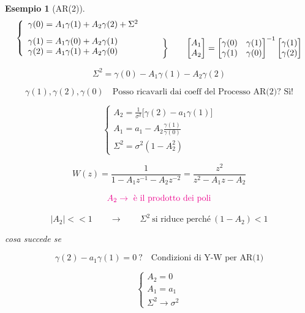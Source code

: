 \documentclass[11pt,a4paper]{article}
\newtheorem{example}{Esempio}
\begin{document}
\begin{example}[AR(2)]
\[
\left\{
\begin{array}{l}
\gamma(0)=A_1\gamma(1)+A_2\gamma(2)+\Sigma^2\\[0.8em]
\gamma(1)=A_1\gamma(0)+A_2\gamma(1)\\
\gamma(2)=A_1\gamma(1)+A_2\gamma(0)
\end{array}
\right.
\qquad
\raisebox{-1.2em}{$\left\}\vphantom{\begin{array}{l}
\gamma(1)=A_1\gamma(0)+A_2\gamma(1)\\
\gamma(2)=A_1\gamma(1)+A_2\gamma(0)
\end{array}}\right.$}
\qquad
\raisebox{-1.2em}{$
\begin{bmatrix}
A_1\\
A_2
\end{bmatrix}
=
\begin{bmatrix}
\gamma(0) & \gamma(1)\\
\gamma(1) & \gamma(0)
\end{bmatrix}^{-1}
\begin{bmatrix}
\gamma(1)\\
\gamma(2)
\end{bmatrix}
$}
\]




\[
\Sigma^2=\gamma(0)-A_1\gamma(1)-A_2\gamma(2)
\]

\[
\gamma(1),\gamma(2),\gamma(0)
\quad
\text{Posso ricavarli dai coeff del Processo AR(2)? Sì!}
\]

\[
\begin{cases}

A_2=\frac{1}{\sigma^2}\bigl[\gamma(2)-a_1\gamma(1)\bigr] \\
A_1=a_1-A_2\frac{\gamma(1)}{\gamma(0)} \\
\Sigma^2=\sigma^2(1-A_2^2)
\end{cases}
\]


\[
W(z)=\frac{1}{1-A_1z^{-1}-A_2z^{-2}}
=
\frac{z^2}{z^2-A_1z-A_2}
\]

\[
\textcolor{magenta}{A_2 \to \text{ è il prodotto dei poli}}
\]

\[
|A_2|<<1
\qquad \to \qquad
\Sigma^2\ \text{si riduce perché}\ (1-A_2)<1
\]

cosa succede se

\[
\gamma(2)-a_1\gamma(1)=0\ ? \quad \text{Condizioni di Y-W per AR(1)}
\]


\[
\begin{cases}
A_2=0\\
A_1=a_1\\
\Sigma^2\to \sigma^2
\end{cases}
\]
\end{example}
\end{document}
